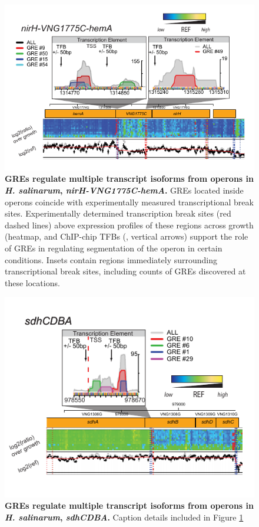 \begin{figure}[hp]
\centering
\includegraphics[width=0.95\linewidth]{figures/nirH.pdf}
\caption[GREs regulate multiple transcript isoforms from operons in {\it H. salinarum}, \textit{nirH-VNG1775C-hemA}.]{\textbf{GREs regulate multiple transcript isoforms from operons in {\it H. salinarum}, \textit{nirH-VNG1775C-hemA}.} GREs located inside operons coincide with experimentally measured transcriptional break sites. Experimentally determined transcription break sites (red dashed lines) above expression profiles of these regions across growth (heatmap, \cite{Koide2009} and ChIP-chip TFBs (\cite{Facciotti2007}, vertical arrows) support the role of GREs in regulating segmentation of the operon in certain conditions. Insets contain regions immediately surrounding transcriptional break sites, including counts of GREs discovered at these locations.}
\label{fig:nirH}
\end{figure}

\begin{figure}[hp]
\centering
\includegraphics[width=0.95\linewidth]{figures/sdh.pdf}
\caption[GREs regulate multiple transcript isoforms from operons in {\it H. salinarum}, \textit{sdhCDBA}.]{\textbf{GREs regulate multiple transcript isoforms from operons in {\it H. salinarum}, \textit{sdhCDBA}.} Caption details included in Figure \ref{fig:nirH}}
\label{fig:sdh}
\end{figure}

